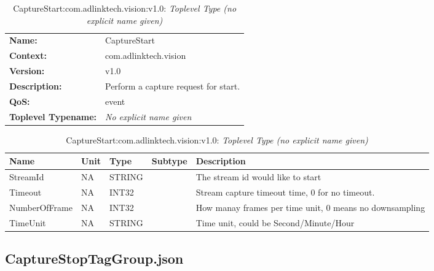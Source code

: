 \begin{table}[H]
\begin{tabularx}{\textwidth}{l X} 
       \textbf{Name:} & CaptureStart \\ 
	   \textbf{Context:} & com.adlinktech.vision \\ 
	   \textbf{Version:} & v1.0 \\ 
	   \textbf{Description:} & Perform a capture request for start. \\ 
	   \textbf{QoS:} & event \\
	   \textbf{Toplevel Typename:} & \textit{No explicit name given} \\ 
\end{tabularx}
\caption{CaptureStart:com.adlinktech.vision:v1.0}\label{CaptureStartTagGroup.json:table:CaptureStart}
\bigskip
\begin{tabularx}{\textwidth}{l l l l X} 
	 \textbf{Name} & \textbf{Unit} & \textbf{Type} & \textbf{Subtype} & \textbf{Description} \\
	 \midrule
   StreamId & NA & STRING &  & The stream id would like to start \\
   Timeout & NA & INT32 &  & Stream capture timeout time, 0 for no timeout. \\
   NumberOfFrame & NA & INT32 &  & How manay frames per time unit, 0 means no downsampling \\
   TimeUnit & NA & STRING &  & Time unit, could be Second/Minute/Hour \\
\end{tabularx}
\caption{CaptureStart:com.adlinktech.vision:v1.0: \textit{Toplevel Type (no explicit name given)}}\label{CaptureStartTagGroup.json:table:CaptureStart-no-type-given}


\end{table}

\subsection{CaptureStopTagGroup.json}

